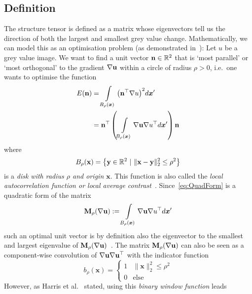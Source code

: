 \subsection{Definition}
The structure tensor is defined as a matrix whose eigenvectors tell us the direction of
both the largest and smallest grey value change. Mathematically, we can model this
as an optimisation problem (as demonstrated in~\cite{ipcv}):\newpage\noindent
Let $u$ be a grey value image.
We want to find a unit vector $\mathbf{n} \in \mathbb{R}^2$ that is `most parallel' or `most orthogonal' to the
gradient $\mathbf{\nabla} \mathbf{u}$ within a circle of radius $\rho > 0$, i.e.\ one wants to optimise the
function
\begin{align}
    E(\mathbf{n}) &= \int\limits_{B_\rho(\boldsymbol x)} {\left(\mathbf{n}^\top\mathbf{\nabla}
    u\right)}^2d\boldsymbol x'\\
    &= \mathbf{n}^\top \left(\int\limits_{B_\rho(\boldsymbol x)} \mathbf{\nabla} \mathbf{u} \mathbf{\nabla}
        u^\top d\boldsymbol x' \right) \mathbf{n}\label{eq:QuadForm}
\end{align}
where
\begin{equation}
    B_\rho( \mathbf{x} ) = \left\lbrace \mathbf{y}\in\mathbb{R}^2\ \vert\ \lVert \mathbf{x} - \mathbf{y}
    \rVert_2^2 \leq \rho^2 \right\rbrace
\end{equation}
is a \textit{disk with radius $\rho$ and origin $ \mathbf{x}$}.
This function is also called the \textit{local autocorrelation function or local average
    contrast}~\cite{harris88, ipcv}.
Since~\eqref{eq:QuadForm} is a quadratic form of the matrix
\begin{equation}
    \mathbf{M}_\rho(\mathbf{\nabla} \mathbf{u}) := \int\limits_{B_\rho(\boldsymbol x)} \mathbf{\nabla} \mathbf{u} \mathbf{\nabla}
    u^\top d\boldsymbol x'
\end{equation}
such an optimal unit vector is by definition also the eigenvector to the smallest and largest
eigenvalue of $\mathbf{M}_\rho(\mathbf{\nabla} \mathbf{u})$~\cite{ipcv}.
The matrix $\mathbf{M}_\rho(\mathbf{\nabla} \mathbf{u})$ can also be seen as a component-wise convolution of 
$\mathbf{\nabla} \mathbf{u}\mathbf{\nabla} \mathbf{u}^\top$ with the indicator function
\begin{equation}
    b_\rho(\boldsymbol x) = \begin{cases} 1 & \lVert \boldsymbol x\rVert_2^2 \leq \rho^2\\ 0 & \text{else} \end{cases}
\end{equation}
However, as Harris et al.~\cite{harris88} stated, using this \textit{binary window function} leads
